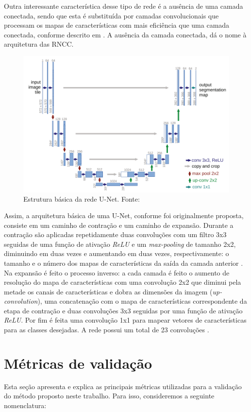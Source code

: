 Outra interessante característica desse tipo de rede é a ausência de uma camada conectada, sendo que esta é substituída por camadas convolucionais que processam os mapas de características com mais eficiência que uma camada conectada, conforme descrito em \cite{long2015fully}. A ausência da camada conectada, dá o nome à arquitetura das \ac{RNCC}.

\begin{figure}
  \centering
  \includegraphics[width=.75\linewidth]{figures/2_theoric_foundamentations/u-net-example.png}
  \caption[Estrutura básica da rede U-Net.]{Estrutura básica da rede U-Net. Fonte: \cite{ronneberger2015u}}
  \label{fig:u-net-example}
\end{figure}

Assim, a arquitetura básica de uma U-Net, conforme foi originalmente proposta, consiste em um caminho de contração e um caminho de expansão. Durante a contração são aplicadas repetidamente duas convoluções com um filtro 3x3 seguidas de uma função de ativação \textit{ReLU} e um \textit{max-pooling} de tamanho 2x2, diminuindo em duas vezes e aumentando em duas vezes, respectivamente: o tamanho e o número dos mapas de características da saída da camada anterior \cite{siddique2021u}. 
Na expansão é feito o processo inverso: a cada camada é feito o aumento de resolução do mapa de características com uma convolução 2x2 que diminui pela metade os canais de características e dobra as dimensões da imagem (\textit{up-convolution}), uma concatenação com o mapa de características correspondente da etapa de contração e duas convoluções 3x3 seguidas por uma função de ativação \textit{ReLU}. Por fim é feita uma convolução 1x1 para mapear vetores de características para as classes desejadas. A rede possui um total de 23 convoluções \cite{ronneberger2015u}.

\section{Métricas de validação}
Esta seção apresenta e explica as principais métricas utilizadas para a validação do método proposto neste trabalho.
Para isso, consideremos a seguinte nomenclatura:

